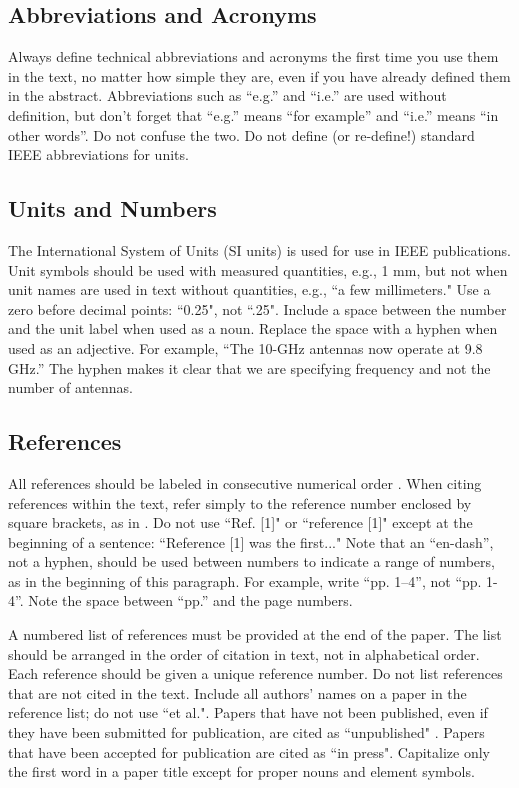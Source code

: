 \documentclass[]{NRSMRev}
\begin{document}
\subsection{Abbreviations and Acronyms}
Always define technical abbreviations and acronyms the first time you use them in the text, no matter how simple they are, even if you have already defined them in the abstract. Abbreviations such as ``e.g.'' and ``i.e.'' are used without definition, but don’t forget that ``e.g.'' means ``for example'' and ``i.e.'' means ``in other words''. Do not confuse the two. Do not define (or re-define!) standard IEEE abbreviations for units.

\subsection{Units and Numbers}
The International System of Units (SI units) is used for use in IEEE publications. Unit symbols should be used with measured quantities, e.g., 1 mm, but not when unit names are used in text without quantities, e.g., ``a few millimeters." Use a zero before decimal points: ``0.25", not ``.25". Include a space between the number and the unit label when used as a noun. Replace the space with a hyphen when used as an adjective. For example, ``The 10-GHz antennas now operate at 9.8 GHz.'' The hyphen makes it clear that we are specifying frequency and not the number of antennas.

\subsection{References}
All references should be labeled in consecutive numerical order \cite{IEEEhowto:eason, IEEEhowto:maxwell, IEEEhowto:doe}. When citing references within the text, refer simply to the reference number enclosed by square brackets, as in \cite{IEEEhowto:eason}.  Do not use ``Ref. [1]" or ``reference [1]" except at the beginning of a sentence: ``Reference [1] was the first..." Note that an ``en-dash'', not a hyphen, should be used between numbers to indicate a range of numbers, as in the beginning of this paragraph. For example, write ``pp. 1--4'', not ``pp. 1-4''. Note the space between ``pp.'' and the page numbers.

A numbered list of references must be provided at the end of the paper. The list should be arranged in the order of citation in text, not in alphabetical order. Each reference should be given a unique reference number. Do not list references that are not cited in the text. Include all authors' names on a paper in the reference list; do not use ``et al.". Papers that have not been published, even if they have been submitted for publication, are cited as ``unpublished" \cite{IEEEhowto:doe}. Papers that have been accepted for publication are cited as ``in press". Capitalize only the first word in a paper title except for proper nouns and element symbols.
\end{document}
